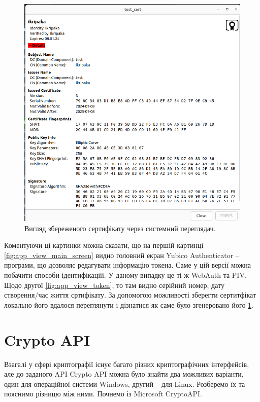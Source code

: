 \begin{figure}[!h]
    		\centering
    		\includegraphics[scale = 0.3]{IMAGES/certicate_view.png}
    		\caption{Вигляд збереженого сертифікату через системний переглядач.}
    		\label{fig:certicate_view}
	\end{figure}

Коментуючи ці картинки можна сказати, що на першій картинці \ref{fig:app_view_main_screen} видно головний екран Yubico Authenticator -- програми, що дозволяє редагувати інформацію токена. Саме у цій версії можна побачити способи ідентифікаціїї. У даному випадку це ті ж WebAuth та PIV.
Щодо другої \ref{fig:app_view_token}, то там видно серійний номер, дату створення/час життя сртифікату. За допомогою можливості зберегти сертитфікат локально його вдалося переглянути і дізнатися як саме було згенеровано його \ref{fig:certicate_view}.

\section{Crypto API}

Взагалі у сфері криптографії існує багато різних криптографічних інтерфейсів, але до заданого API Crypto API можна було знайти два можливих варіанти, один для операційної системи Windows, другий -- для Linux. Розберемо їх та пояснимо різницю між ними. Почнемо із Microsoft CryptoAPI.

